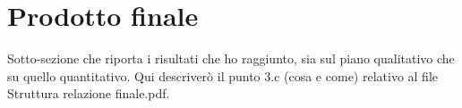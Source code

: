 \section{Prodotto finale}

Sotto-sezione che riporta i risultati che ho raggiunto, sia sul piano qualitativo che su quello quantitativo.
Qui descriverò il punto 3.c (cosa e come) relativo al file Struttura relazione finale.pdf.